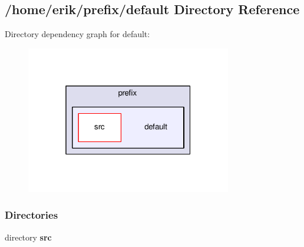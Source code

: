 \subsection{/home/erik/prefix/default Directory Reference}
\label{dir_39c8bc37e19f05461b414d975c570109}
Directory dependency graph for default\+:
\nopagebreak
\begin{figure}[H]
\begin{center}
\leavevmode
\includegraphics[width=254pt]{dir_39c8bc37e19f05461b414d975c570109_dep}
\end{center}
\end{figure}
\subsubsection*{Directories}
\begin{DoxyCompactItemize}
\item 
directory {\bf src}
\end{DoxyCompactItemize}
